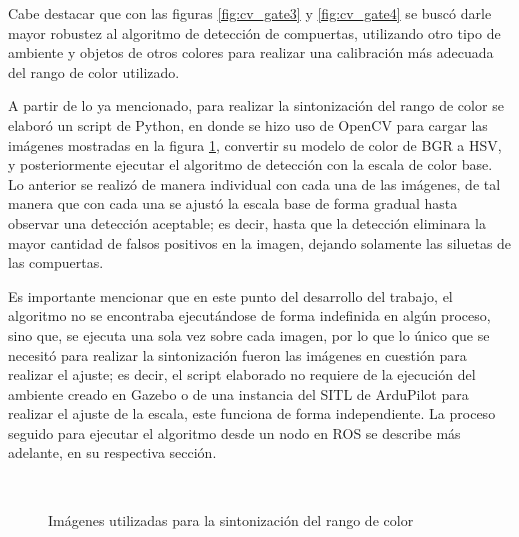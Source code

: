 Cabe destacar que  con las figuras \ref{fig:cv_gate3} y \ref{fig:cv_gate4} se buscó darle mayor robustez al algoritmo de detección de compuertas, utilizando otro tipo de ambiente y objetos de otros colores para realizar una calibración más adecuada del rango de color utilizado.

A partir de lo ya mencionado, para realizar la sintonización del rango de color se elaboró un script de Python, en donde se hizo uso de OpenCV para cargar las imágenes mostradas en la figura \ref{fig:cv_gates}, convertir su modelo de color de BGR a HSV, y posteriormente ejecutar el algoritmo de detección con la escala de color base. Lo anterior se realizó de manera individual con cada una de las imágenes, de tal manera que con cada una se ajustó la escala base de forma gradual hasta observar una detección aceptable; es decir, hasta que la detección eliminara la mayor cantidad de falsos positivos en la imagen, dejando solamente las siluetas de las compuertas. 

Es importante mencionar que en este punto del desarrollo del trabajo, el algoritmo no se encontraba ejecutándose de forma indefinida en algún proceso, sino que, se ejecuta una sola vez sobre cada imagen, por lo que lo único que se necesitó para realizar la sintonización fueron las imágenes en cuestión para realizar el ajuste; es decir, el script elaborado no requiere de la ejecución del ambiente creado en Gazebo o de una instancia del SITL de ArduPilot para realizar el ajuste de la escala, este funciona de forma independiente. La proceso seguido para ejecutar el algoritmo desde un nodo en ROS se describe más adelante, en su respectiva sección.


\begin{figure}[ht]
    \centering
    \hfill
    \\
    \hfill
    \hfill

    \caption{Imágenes utilizadas para la sintonización del rango de color}
    \label{fig:cv_gates}
\end{figure}

